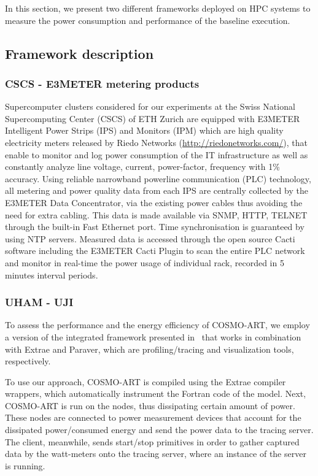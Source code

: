 In this section,  we present two different frameworks  deployed on HPC
systems  to  measure the  power  consumption  and  performance of  the
baseline execution.

\subsection{Framework description}
\label{subsec:3.1}

\subsubsection{CSCS - E3METER metering products}
Supercomputer  clusters considered  for our  experiments at  the Swiss
National Supercomputing Center (CSCS)  of ETH Zurich are equipped with
E3METER Intelligent  Power Strips (IPS)  and Monitors (IPM)  which are
high   quality   electricity  meters   released   by  Riedo   Networks
(\url{http://riedonetworks.com/}),  that  enable  to monitor  and  log
power  consumption of  the  IT infrastructure  as  well as  constantly
analyze  line  voltage,  current,  power-factor,  frequency  with  1\%
accuracy.   Using reliable  narrowband  powerline communication  (PLC)
technology,  all metering  and power  quality data  from each  IPS are
centrally collected by the E3METER Data Concentrator, via the existing
power cables thus  avoiding the need for extra  cabling.  This data is
made  available  via SNMP,  HTTP,  TELNET  through  the built-in  Fast
Ethernet  port.   Time  synchronisation  is guaranteed  by  using  NTP
servers.   Measured data  is accessed  through the  open  source Cacti
software including  the E3METER  Cacti Plugin to  scan the  entire PLC
network and monitor  in real-time the power usage  of individual rack,
recorded in 5 minutes interval periods.

\subsubsection{UHAM - UJI}
To assess the  performance and the energy efficiency  of COSMO-ART, we
employ   a    version   of   the    integrated   framework   presented
in~\cite{energy13} that works in  combination with Extrae and Paraver,
which are profiling/tracing and visualization tools, respectively.

To use our  approach, COSMO-ART is compiled using  the Extrae compiler
wrappers,  which  automatically instrument  the  Fortran  code of  the
model. Next, COSMO-ART  is run on the nodes,  thus dissipating certain
amount  of power.   These  nodes are  connected  to power  measurement
devices that account for the dissipated power/consumed energy and send
the power  data to the  tracing server.  The client,  meanwhile, sends
start/stop  primitives  in  order  to  gather  captured  data  by  the
watt-meters onto the  tracing server, where an instance  of the \pmlib
server is running.


